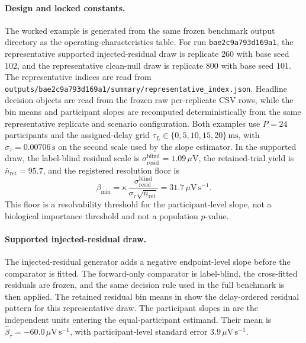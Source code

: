 
\paragraph{Design and locked constants.}
The worked example is generated from the same frozen benchmark output directory as the operating-characteristics table. For run \texttt{bae2c9a793d169a1}, the representative supported injected-residual draw is replicate \(260\) with base seed \(102\), and the representative clean-null draw is replicate \(800\) with base seed \(101\).
The representative indices are read from \texttt{outputs/bae2c9a793d169a1/summary/representative\_index.json}. Headline decision objects are read from the frozen raw per-replicate CSV rows, while the bin means and participant slopes are recomputed deterministically from the same representative replicate and scenario configuration.
Both examples use \(P=24\) participants and the assigned-delay grid \(\tau_L\in\{0, 5, 10, 15, 20\}\,\mathrm{ms}\), with \(\sigma_\tau=0.00706\,\mathrm{s}\) on the second scale used by the slope estimator.
In the supported draw, the label-blind residual scale is \(\sigma^{\mathrm{blind}}_{\mathrm{resid}}=1.09\,\mu\mathrm{V}\), the retained-trial yield is \(\bar n_{\mathrm{ret}}=95.7\), and the registered resolution floor is
\[
\beta_{\min}=\kappa\,\frac{\sigma^{\mathrm{blind}}_{\mathrm{resid}}}{\sigma_\tau\sqrt{\bar n_{\mathrm{ret}}}}=31.7\,\mu\mathrm{V\,s^{-1}} .
\]
This floor is a resolvability threshold for the participant-level slope, not a biological importance threshold and not a population \(p\)-value.

\paragraph{Supported injected-residual draw.}
The injected-residual generator adds a negative endpoint-level slope before the comparator is fitted. The forward-only comparator is label-blind, the cross-fitted residuals are frozen, and the same decision rule used in the full benchmark is then applied.
The retained residual bin means in  show the delay-ordered residual pattern for this representative draw. The participant slopes in  are the independent units entering the equal-participant estimand. Their mean is \(\widehat\beta_\tau=-60.0\,\mu\mathrm{V\,s^{-1}}\), with participant-level standard error \(3.9\,\mu\mathrm{V\,s^{-1}}\).

